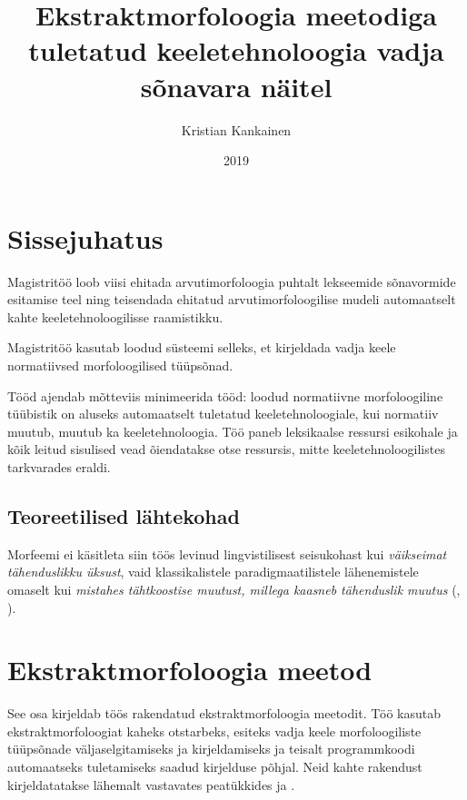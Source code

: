 \documentclass[12pt,a4paper]{article}
\begin{document}
\title{Ekstraktmorfoloogia meetodiga tuletatud keeletehnoloogia vadja sõnavara näitel}
\author{Kristian Kankainen}
\date{2019}
\maketitle


\newpage
\tableofcontents



\newpage
{}
\section{Sissejuhatus}

Magistritöö loob viisi ehitada arvutimorfoloogia puhtalt lekseemide sõnavormide esitamise teel ning teisendada ehitatud arvutimorfoloogilise mudeli automaatselt kahte keeletehnoloogilisse raamistikku.

Magistritöö kasutab loodud süsteemi selleks, et kirjeldada vadja keele normatiivsed morfoloogilised tüüpsõnad.

Tööd ajendab mõtteviis minimeerida tööd: loodud normatiivne morfoloogiline tüübistik on aluseks automaatselt tuletatud keeletehnoloogiale, kui normatiiv muutub, muutub ka keeletehnoloogia. Töö paneb leksikaalse ressursi esikohale ja kõik leitud sisulised vead õiendatakse otse ressursis, mitte keeletehnoloogilistes tarkvarades eraldi.




\subsection{Teoreetilised lähtekohad}

Morfeemi ei käsitleta siin töös levinud lingvistilisest seisukohast kui \textit{väikseimat tähenduslikku üksust}, vaid klassikalistele paradigmaatilistele lähenemistele omaselt kui \textit{mistahes tähtkoostise muutust, millega kaasneb tähenduslik muutus} (\cite{beard_morpheme_1987}, \cite{beard_lexeme-morpheme_1995}).




\newpage
\section{Ekstraktmorfoloogia meetod}
\label{sec:ekstraktmorfoloogia-meetod}
See osa kirjeldab töös rakendatud ekstraktmorfoloogia meetodit. Töö kasutab ekstraktmorfoloogiat kaheks otstarbeks, esiteks vadja keele morfoloogiliste tüüpsõnade väljaselgitamiseks ja kirjeldamiseks ja teisalt programmkoodi automaatseks tuletamiseks saadud kirjelduse põhjal. Neid kahte rakendust kirjeldatatakse lähemalt vastavates peatükkides \textit{} ja \textit{}.
\end{document}
